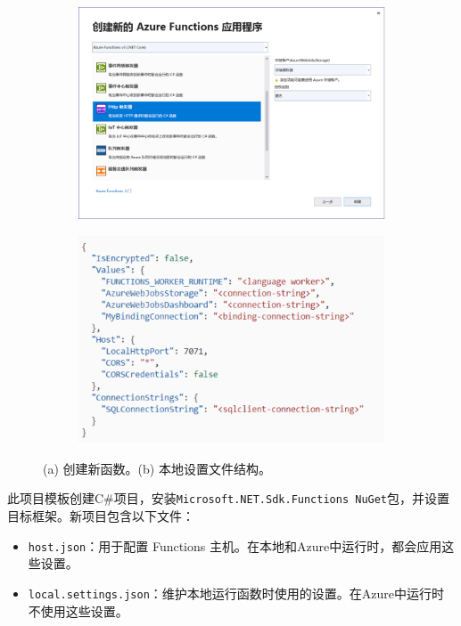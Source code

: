\begin{figure}[!htbp]
	\begin{subfigure}[b]{0.5\linewidth}
		\includegraphics[width=\linewidth]{figs/3.png}
		\caption{}
		\label{fig3}
	\end{subfigure}
	\begin{subfigure}[b]{0.5\linewidth}
		\includegraphics[width=\linewidth]{figs/4.png}
		\caption{}
		\label{fig4}
	\end{subfigure}
	\caption{(a) 创建新函数。(b) 本地设置文件结构。}
\end{figure}
此项目模板创建C\#项目，安装\texttt{Microsoft.NET.Sdk.Functions NuGet}包，并设置目标框架。新项目包含以下文件：
\begin{itemize}
	\item \texttt{host.json}：用于配置 Functions 主机。在本地和Azure中运行时，都会应用这些设置。 
	\item \texttt{local.settings.json}：维护本地运行函数时使用的设置。在Azure中运行时不使用这些设置。
\end{itemize}

